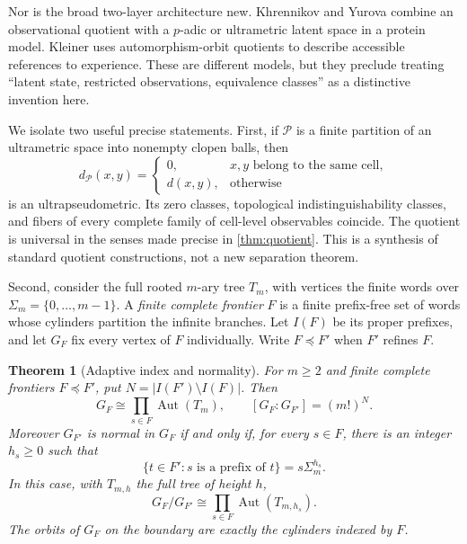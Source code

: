 \documentclass[11pt]{article}
\newtheorem{theorem}{Theorem}[section]
\theoremstyle{definition}
\theoremstyle{remark}
\newcommand{\Aut}{\operatorname{Aut}}
\newcommand{\PP}{\mathcal P}
\begin{document}
Nor is the broad two-layer architecture new. Khrennikov and Yurova \cite[Sections 4 and 9]{KhrennikovYurova2017} combine an observational quotient with a $p$-adic or ultrametric latent space in a protein model. Kleiner \cite[Section 3.4]{Kleiner2020} uses automorphism-orbit quotients to describe accessible references to experience. These are different models, but they preclude treating ``latent state, restricted observations, equivalence classes'' as a distinctive invention here.

We isolate two useful precise statements. First, if $\PP$ is a finite partition of an ultrametric space into nonempty clopen balls, then
\begin{equation}\label{eq:collapse}
 d_{\PP}(x,y)=
 \begin{cases}0,&x,y\text{ belong to the same cell},\\d(x,y),&\text{otherwise}\end{cases}
\end{equation}
is an ultrapseudometric. Its zero classes, topological indistinguishability classes, and fibers of every complete family of cell-level observables coincide. The quotient is universal in the senses made precise in \cref{thm:quotient}. This is a synthesis of standard quotient constructions, not a new separation theorem.

Second, consider the full rooted $m$-ary tree $T_m$, with vertices the finite words over $\Sigma_m=\{0,\ldots,m-1\}$. A \emph{finite complete frontier} $F$ is a finite prefix-free set of words whose cylinders partition the infinite branches. Let $I(F)$ be its proper prefixes, and let $G_F$ fix every vertex of $F$ individually. Write $F\preceq F'$ when $F'$ refines $F$.

\begin{theorem}[Adaptive index and normality]\label{thm:adaptive}
For $m\geq2$ and finite complete frontiers $F\preceq F'$, put
$N=|I(F')\setminus I(F)|$. Then
\begin{equation}\label{eq:index}
 G_F\cong\prod_{s\in F}\Aut(T_m),\qquad
 [G_F:G_{F'}]=(m!)^N.
\end{equation}
Moreover $G_{F'}$ is normal in $G_F$ if and only if, for every $s\in F$, there is an integer $h_s\geq0$ such that
\begin{equation}\label{eq:normalcriterion}
 \{t\in F':s\text{ is a prefix of }t\}=s\Sigma_m^{h_s}.
\end{equation}
In this case, with $T_{m,h}$ the full tree of height $h$,
\begin{equation}\label{eq:normalquotient}
 G_F/G_{F'}\cong\prod_{s\in F}\Aut(T_{m,h_s}).
\end{equation}
The orbits of $G_F$ on the boundary are exactly the cylinders indexed by $F$.
\end{theorem}
\end{document}
